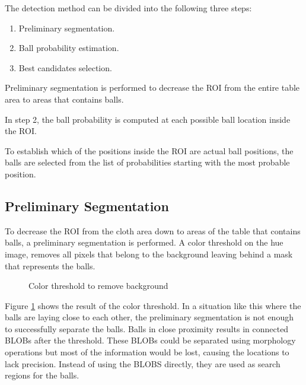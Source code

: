 The detection method can be divided into the following three steps:
\begin{enumerate}
  \item Preliminary segmentation.
  \item Ball probability estimation.
  \item Best candidates selection.
\end{enumerate}

Preliminary segmentation is performed to decrease the ROI from the entire table area to areas that contains balls.

In step 2, the ball probability is computed at each possible ball location inside the ROI.

To establish which of the positions inside the ROI are actual ball positions, the balls are selected from the list of probabilities starting with the most probable position.

\subsection{Preliminary Segmentation}
To decrease the ROI from the cloth area down to areas of the table that contains balls, a preliminary segmentation is performed. A color threshold on the hue image, removes all pixels that belong to the background leaving behind a mask that represents the balls.
\begin{figure}[htpb]
  \centering
  \quad           
   \caption{Color threshold to remove background}
  \label{fig:thres1}
\end{figure}
Figure \ref{fig:thres1} shows the result of the color threshold. In a situation like this where the balls are laying close to each other, the preliminary segmentation is not enough to successfully separate the balls. Balls in close proximity results in connected BLOBs after the threshold. These BLOBs could be separated using morphology operations but most of the information would be lost, causing the locations to lack precision. Instead of using the BLOBS directly, they are used as search regions for the balls.

